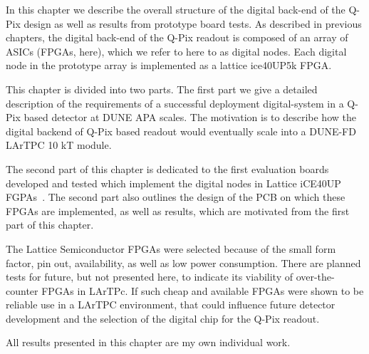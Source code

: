 In this chapter we describe the overall structure of the digital back-end of the Q-Pix design as well as results from prototype board tests.
As described in previous chapters, the digital back-end of the Q-Pix readout is composed of an array of ASICs (FPGAs, here), which we refer to here to as digital nodes.
Each digital node in the prototype array is implemented as a lattice ice40UP5k FPGA.

This chapter is divided into two parts.
The first part we give a detailed description of the requirements of a successful deployment digital-system in a Q-Pix based detector at DUNE APA scales.
The motivation is to describe how the digital backend of Q-Pix based readout would eventually scale into a DUNE-FD LArTPC 10 kT module.

The second part of this chapter is dedicated to the first evaluation boards developed and tested which implement the digital nodes in Lattice iCE40UP FGPAs~\citep{lattice_ice40up_datasheet}.
The second part also outlines the design of the PCB on which these FPGAs are implemented, as well as results, which are motivated from the first part of this chapter.

The Lattice Semiconductor FPGAs \citep{lattice_ice40up_datasheet} were selected because of the small form factor, pin out, availability, as well as low power consumption.
There are planned tests for future, but not presented here, to indicate its viability of over-the-counter FPGAs in LArTPc.
If such cheap and available FPGAs were shown to be reliable use in a LArTPC environment, that could influence future detector development and the selection of the digital chip for the Q-Pix readout.

All results presented in this chapter are my own individual work.



